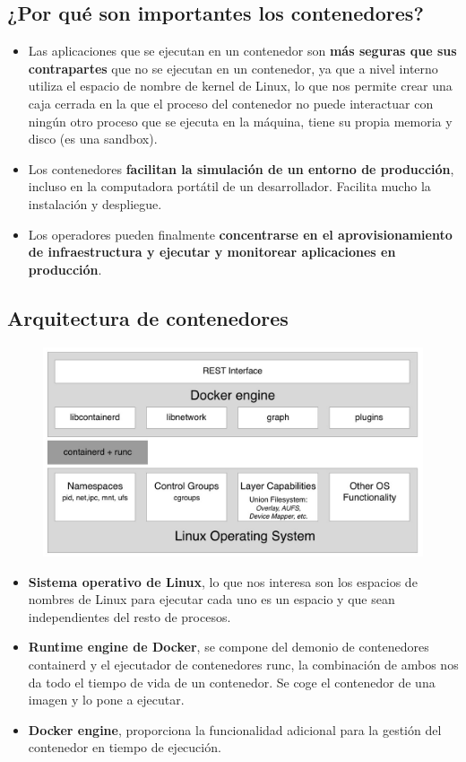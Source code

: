 \documentclass[12pt]{report} %
\begin{document}
\subsection{¿Por qué son importantes los contenedores?}
\begin{itemize}
	\item Las aplicaciones que se ejecutan en un contenedor son \textbf{más seguras que sus contrapartes} que no se ejecutan en un contenedor, ya que a nivel interno utiliza el espacio de nombre de kernel de Linux, lo que nos permite crear una caja cerrada en la que el proceso del contenedor no puede interactuar con ningún otro proceso que se ejecuta en la máquina, tiene su propia memoria y disco (es una sandbox).
	
	\item Los contenedores \textbf{facilitan la simulación de un entorno de producción}, incluso en la computadora portátil de un desarrollador.
	Facilita mucho la instalación y despliegue.

	\item Los operadores pueden finalmente \textbf{concentrarse en el aprovisionamiento de infraestructura y ejecutar y monitorear aplicaciones en producción}.
\end{itemize}

\subsection{Arquitectura de contenedores}
\begin{figure}[H]
	{\includegraphics[scale=.4]{default.jpg}}
\end{figure}
\begin{itemize}
	\item \textbf{Sistema operativo de Linux}, lo que nos interesa son los espacios de nombres de Linux para ejecutar cada uno es un espacio y que sean independientes del resto de procesos.
	\item \textbf{Runtime engine de Docker}, se compone del demonio de contenedores containerd y el ejecutador de contenedores runc, la combinación de ambos nos da todo el tiempo de vida de un contenedor. Se coge el contenedor de una imagen y lo pone a ejecutar.
	\item \textbf{Docker engine}, proporciona la funcionalidad adicional para la gestión del contenedor en tiempo de ejecución.
\end{itemize}
\end{document}
